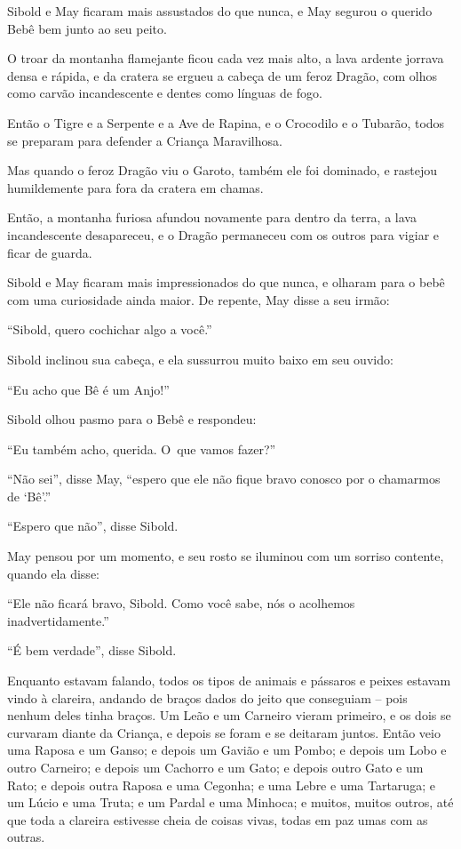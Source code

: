 Sibold e May ficaram mais assustados do que nunca, e May segurou o
querido Bebê bem junto ao seu peito.

O troar da montanha flamejante ficou cada vez mais alto, a lava ardente
jorrava densa e rápida, e da cratera se ergueu a cabeça de um feroz
Dragão, com olhos como carvão incandescente e dentes como línguas de
fogo.

Então o Tigre e a Serpente e a Ave de Rapina, e o Crocodilo e o Tubarão,
todos se preparam para defender a Criança Maravilhosa.

Mas quando o feroz Dragão viu o Garoto, também ele foi dominado, e
rastejou humildemente para fora da cratera em chamas.

Então, a montanha furiosa afundou novamente para dentro da terra, a lava
incandescente desapareceu, e o Dragão permaneceu com os outros para
vigiar e ficar de guarda.

Sibold e May ficaram mais impressionados do que nunca, e olharam para o
bebê com uma curiosidade ainda maior. De repente, May disse a seu irmão:

``Sibold, quero cochichar algo a você.''

Sibold inclinou sua cabeça, e ela sussurrou muito baixo em seu ouvido:

``Eu acho que Bê é um Anjo!''

Sibold olhou pasmo para o Bebê e respondeu:

``Eu também acho, querida. O~que vamos fazer?''

``Não sei'', disse May, ``espero que ele não fique bravo conosco por o
chamarmos de `Bê'.''

``Espero que não'', disse Sibold.

May pensou por um momento, e seu rosto se iluminou com um sorriso
contente, quando ela disse:

``Ele não ficará bravo, Sibold. Como você sabe, nós o acolhemos
inadvertidamente.''

``É bem verdade'', disse Sibold.

Enquanto estavam falando, todos os tipos de animais e pássaros e peixes
estavam vindo à clareira, andando de braços dados do jeito que
conseguiam -- pois nenhum deles tinha braços. Um Leão e um Carneiro
vieram primeiro, e os dois se curvaram diante da Criança, e depois se
foram e se deitaram juntos. Então veio uma Raposa e um Ganso; e depois
um Gavião e um Pombo; e depois um Lobo e outro Carneiro; e depois um
Cachorro e um Gato; e depois outro Gato e um Rato; e depois outra Raposa
e uma Cegonha; e uma Lebre e uma Tartaruga; e um Lúcio e uma Truta; e um
Pardal e uma Minhoca; e muitos, muitos outros, até que toda a clareira
estivesse cheia de coisas vivas, todas em paz umas com as outras.

